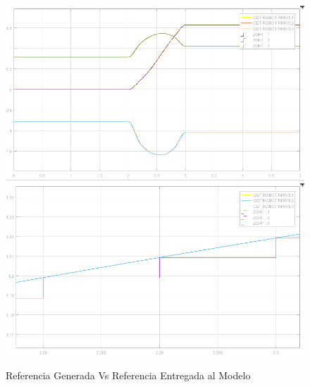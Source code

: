 \begin{itemize}
	
		\begin{figure}[h!]
			\centering
			\includegraphics[width=.4\textwidth]{ZoHComparativa} \hspace{0.2cm} \includegraphics[width=.4\textwidth]{ZoHComparativaDetalle}
			\caption{Referencia Generada Vs Referencia Entregada al Modelo}
		\end{figure}
					
		
			

	\end{itemize}
			  
	